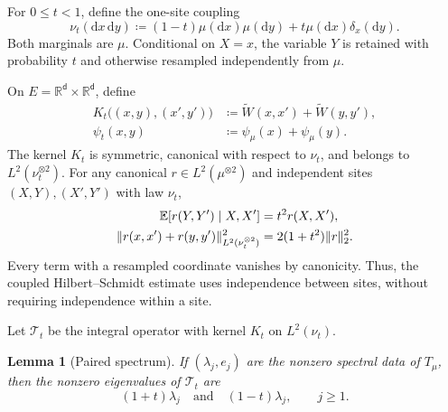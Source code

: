 \documentclass[11pt,reqno]{amsart}
\numberwithin{equation}{section}
\theoremstyle{plain}
\newtheorem{lemma}[lemma]{Lemma}
\theoremstyle{remark}
\DeclarePairedDelimiter{\norm}{\lVert}{\rVert}
\renewcommand{\d}{\mathsf{d}}
\newcommand{\md}{\mathrm{d}}
\newcommand{\R}{{\mathbb{R}}}
\newcommand{\E}{{\mathbb{E}}}
\newcommand{\tl}{\widetilde}
\begin{document}
For $0\leq t<1$, define the one-site coupling
\begin{equation}\label{eq:exact-nu-t}
 \nu_t(\md x\,\md y)
 \coloneqq
 (1-t)\mu(\md x)\mu(\md y)
 +t\mu(\md x)\delta_x(\md y).
\end{equation}
Both marginals are $\mu$.  Conditional on $X=x$, the variable $Y$ is retained with probability $t$ and otherwise resampled independently from $\mu$.

On $E=\R^{\d}\times\R^{\d}$, define
\begin{align}
 K_t\big((x,y),(x',y')\big)
 &\coloneqq\tl W(x,x')+\tl W(y,y'),\label{eq:exact-paired-kernel}\\
 \psi_t(x,y)&\coloneqq\psi_\mu(x)+\psi_\mu(y).\label{eq:exact-paired-source}
\end{align}
The kernel $K_t$ is symmetric, canonical with respect to $\nu_t$, and belongs to $L^2(\nu_t^{\otimes2})$.
For any canonical $r\in L^2(\mu^{\otimes2})$ and independent sites $(X,Y),(X',Y')$ with law $\nu_t$,
\begin{align}
 \E[r(Y,Y')\mid X,X']&=t^2r(X,X'),\label{eq:quantitative-paired-conditional}\\
 \norm{r(x,x')+r(y,y')}_{L^2(\nu_t^{\otimes2})}^2
 &=2(1+t^2)\norm r_2^2.\label{eq:quantitative-paired-tail-norm}
\end{align}
Every term with a resampled coordinate vanishes by canonicity. Thus, the coupled Hilbert--Schmidt estimate uses independence between sites, without requiring independence within a site.

Let $\mathcal T_t$ be the integral operator with kernel $K_t$ on $L^2(\nu_t)$.

\begin{lemma}[Paired spectrum]\label{lem:exact-paired-spectrum}
If $(\lambda_j,e_j)$ are the nonzero spectral data of $T_\mu$, then the nonzero eigenvalues of $\mathcal T_t$ are
\begin{equation}\label{eq:exact-paired-spectrum}
 (1+t)\lambda_j
 \quad\text{and}\quad
 (1-t)\lambda_j,
 \qquad j\geq1.
\end{equation}
\end{lemma}
\end{document}
